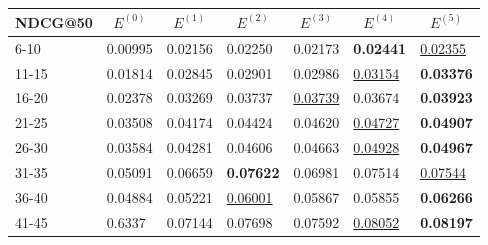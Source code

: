 \begin{table*}[]
    \begin{tabular}{|l|l|l|l|l|l|l|}
    \hline
    NDCG@50 & \multicolumn{1}{c|}{$E^{(0)}$} & \multicolumn{1}{c|}{$E^{(1)}$} & \multicolumn{1}{c|}{$E^{(2)}$} & \multicolumn{1}{c|}{$E^{(3)}$} & \multicolumn{1}{c|}{$E^{(4)}$} & \multicolumn{1}{c|}{$E^{(5)}$} \\ \hline
    6-10    & 0.00995                        & 0.02156                        & 0.02250                        & 0.02173                        & \textbf{0.02441}               & \underline{0.02355}                        \\ \hline
    11-15   & 0.01814                        & 0.02845                        & 0.02901                        & 0.02986                        & \underline{0.03154}            & \textbf{0.03376}                        \\ \hline
    16-20   & 0.02378                        & 0.03269                        & 0.03737                        & \underline{0.03739}            & 0.03674                        & \textbf{0.03923}                        \\ \hline
    21-25   & 0.03508                        & 0.04174                        & 0.04424                        & 0.04620                        & \underline{0.04727}            & \textbf{0.04907}                        \\ \hline
    26-30   & 0.03584                        & 0.04281                        & 0.04606                        & 0.04663                        & \underline{0.04928}                        & \textbf{0.04967}                        \\ \hline
    31-35   & 0.05091                        & 0.06659                        & \textbf{0.07622}               & 0.06981                        & 0.07514                        & \underline{0.07544}                        \\ \hline
    36-40   & 0.04884                        & 0.05221                        & \underline{0.06001}            & 0.05867                        & 0.05855                        & \textbf{0.06266}                        \\ \hline
    41-45   & 0.6337                         & 0.07144                        & 0.07698                        & 0.07592                        & \underline{0.08052}            & \textbf{0.08197}                        \\ \hline

\end{tabular}
\end{table*}
